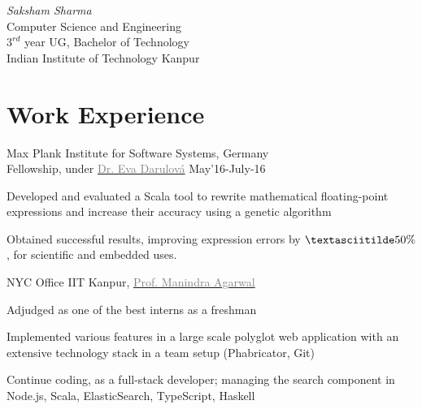 \documentclass{tccv}
\begin{document}
{ \textit{Saksham \textcolor{myred}{Sharma}}}
\medskip\\
\large{Computer Science and Engineering}\\
\large{$3^{rd}$ year UG, Bachelor of Technology}\\
{Indian Institute of Technology Kanpur}

\vspace{-0.5cm}
\section{Work Experience}
\vspace{-0.1cm}
\begin{experience}

  {Max Plank Institute for Software Systems, \small{Germany}\\
  Fellowship, under
  \href{http://www.mpi-sws.org/~eva}{\textcolor{gray}{Dr. Eva
      Darulová}}
  \hfill May'16-July-16}
  {
  \item Developed and evaluated a Scala tool to rewrite
    mathematical floating-point expressions and increase their
    accuracy using a genetic algorithm
  \item Obtained successful results, improving expression errors by
    $\textasciitilde50\%$, for scientific and embedded uses.
  }

  {NYC Office IIT Kanpur,
    \href{http://cse.iitk.ac.in/~manindra}{\textcolor{gray}{Prof. Manindra Agarwal}}}
  {
  \item Adjudged as one of the best interns as a freshman
  \item Implemented various features in a large scale polyglot web
    application with an extensive technology stack in a team setup
    (Phabricator, Git)
  \item Continue coding, as a full-stack developer;
    managing the search component in Node.js, Scala, ElasticSearch,
    TypeScript, Haskell
  }
\end{experience}

\vspace{-0.5cm}
\end{document}
